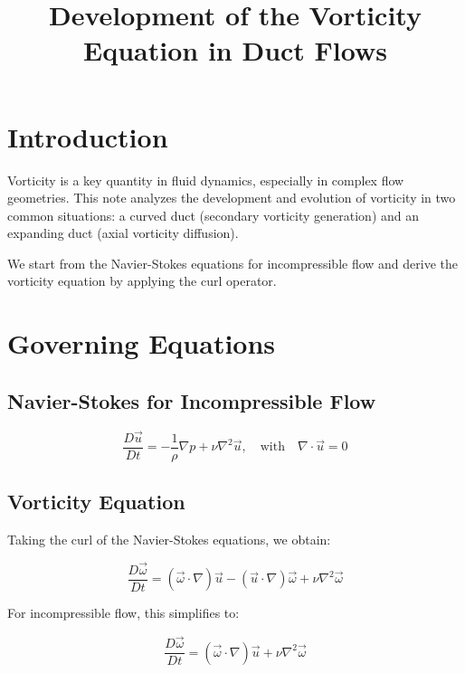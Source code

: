 \documentclass{article}
\title{Development of the Vorticity Equation in Duct Flows}
\begin{document}
\maketitle

\section{Introduction}

Vorticity is a key quantity in fluid dynamics, especially in complex flow geometries. This note analyzes the development and evolution of vorticity in two common situations: a curved duct (secondary vorticity generation) and an expanding duct (axial vorticity diffusion).

\vspace{1em}
We start from the Navier-Stokes equations for incompressible flow and derive the vorticity equation by applying the curl operator.

\section{Governing Equations}

\subsection{Navier-Stokes for Incompressible Flow}
\begin{equation}
    \frac{D\vec{u}}{Dt} = -\frac{1}{\rho}\nabla p + \nu \nabla^2 \vec{u}, \quad \text{with} \quad \nabla \cdot \vec{u} = 0
\end{equation}

\subsection{Vorticity Equation}
Taking the curl of the Navier-Stokes equations, we obtain:

\begin{equation}
    \frac{D\vec{\omega}}{Dt} = (\vec{\omega} \cdot \nabla)\vec{u} - (\vec{u} \cdot \nabla)\vec{\omega} + \nu \nabla^2 \vec{\omega}
\end{equation}

For incompressible flow, this simplifies to:

\begin{equation}
    \frac{D\vec{\omega}}{Dt} = (\vec{\omega} \cdot \nabla)\vec{u} + \nu \nabla^2 \vec{\omega}
\end{equation}
\end{document}
